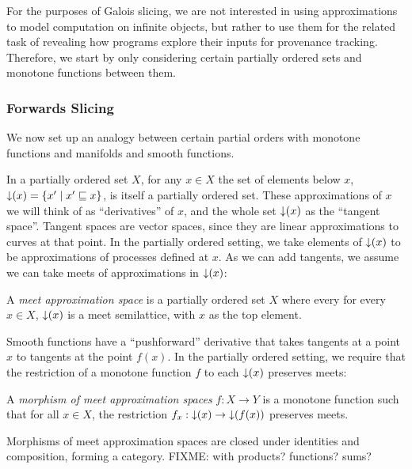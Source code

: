 For the purposes of Galois slicing, we are not interested in using
approximations to model computation on infinite objects, but rather to
use them for the related task of revealing how programs explore their
inputs for provenance tracking. Therefore, we start by only
considering certain partially ordered sets and monotone functions
between them.

\subsubsection{Forwards Slicing}

We now set up an analogy between certain partial orders with monotone
functions and manifolds and smooth functions.

In a partially ordered set $X$, for any $x \in X$ the set of elements
below $x$, $\mathop{\downarrow}(x) = \{ x' \mid x' \sqsubseteq x \}$, is itself a
partially ordered set. These approximations of $x$ we will think of as
``derivatives'' of $x$, and the whole set $\mathop{\downarrow}(x)$ as the
``tangent space''. Tangent spaces are vector spaces, since they are
linear approximations to curves at that point. In the partially
ordered setting, we take elements of $\mathop{\downarrow}(x)$ to be
approximations of processes defined at $x$. As we can add tangents, we
assume we can take meets of approximations in $\mathop{\downarrow}(x)$:

\begin{definition}
  A \emph{meet approximation space} is a partially ordered set $X$
  where every for every $x \in X$, $\mathop{\downarrow}(x)$ is a meet
  semilattice, with $x$ as the top element.
\end{definition}

Smooth functions have a ``pushforward'' derivative that takes tangents
at a point $x$ to tangents at the point $f(x)$. In the partially
ordered setting, we require that the restriction of a monotone
function $f$ to each $\mathop{\downarrow}(x)$ preserves meets:

\begin{definition}
  A \emph{morphism of meet approximation spaces} $f : X \to Y$ is a
  monotone function such that for all $x \in X$, the restriction
  $f_x : \mathop{\downarrow}(x) \to \mathop{\downarrow}(f(x))$ preserves meets.
\end{definition}

\begin{lemma}
  Morphisms of meet approximation spaces are closed under identities
  and composition, forming a category. FIXME: with products?
  functions? sums?
\end{lemma}

